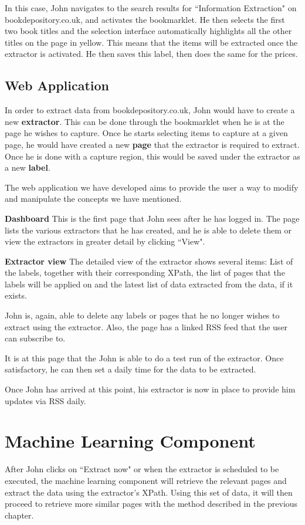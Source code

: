 In this case, John navigates to the search results for ``Information Extraction"
on bookdepository.co.uk, and activates the bookmarklet. He then selects the first
two book titles and the selection interface automatically highlights all the other
titles on the page in yellow. This means that the items will be extracted once the
extractor is activated. He then saves this label, then does the same for the prices.


\subsection{Web Application}

In order to extract data from bookdepository.co.uk, John would have to create a new 
\textbf{extractor}. This can be done through the bookmarklet when he is at the page 
he wishes to capture. Once he starts selecting items to capture at a given page,
he would have created a new \textbf{page} that the extractor is required to extract.
Once he is done with a capture region, this would be saved under the extractor as a
new \textbf{label}. 

The web application we have developed aims to provide the user a way to modify and
 manipulate the concepts we have mentioned.

\textbf{Dashboard} This is the first page that John sees
 after he has logged in. The page lists the various extractors that he has created, and 
 he is able to delete them or view the extractors in greater detail by clicking ``View".

\textbf{Extractor view} The detailed view of the extractor shows several items:
 List of the labels, together with their corresponding XPath,
 the list of pages that the labels will be applied on and
the latest list of data extracted from the data, if it exists.

 John is, again, able to delete any labels or pages that he no longer wishes to extract
 using the extractor. Also, the page has a linked RSS feed that the user can subscribe to.
 
 It is at this page that the John is able to do a test run of the extractor. Once satisfactory,
 he can then set a daily time for the data to be extracted.
 
 Once John has arrived at this point, his extractor is now in place to provide him updates
 via RSS daily.
\section{Machine Learning Component}
After John clicks on ``Extract now" or when the extractor is scheduled to be executed, the
machine learning component will retrieve the relevant pages and extract the data using the
extractor's XPath. Using this set of data, it will then proceed to retrieve more similar pages
with the method described in the previous chapter.


